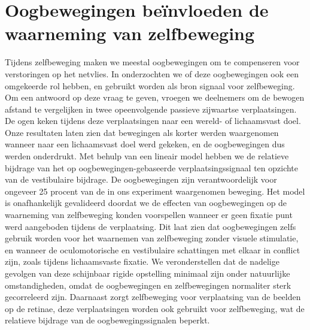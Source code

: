 \section{Oogbewegingen be\"invloeden de waarneming van zelfbeweging}
Tijdens zelfbeweging maken we meestal oogbewegingen om te compenseren voor verstoringen op het netvlies. In  onderzochten we of deze oogbewegingen ook een omgekeerde rol hebben, en gebruikt worden als bron signaal voor zelfbeweging. Om een antwoord op deze vraag te geven, vroegen we deelnemers om de bewogen afstand te vergelijken in twee opeenvolgende passieve zijwaartse verplaatsingen. De ogen keken tijdens deze verplaatsingen naar een wereld- of lichaamsvast doel. Onze resultaten laten zien dat bewegingen als korter werden waargenomen wanneer naar een lichaamsvast doel werd gekeken, en de oogbewegingen dus werden onderdrukt. Met behulp van een lineair model hebben we de relatieve bijdrage van het op oogbewegingen-gebaseerde  verplaatsingssignaal ten opzichte van de vestibulaire bijdrage. De oogbewegingen zijn verantwoordelijk voor ongeveer 25 procent van de in ons experiment waargenomen beweging. Het model is onafhankelijk gevalideerd doordat we de effecten van oogbewegingen op de waarneming van zelfbeweging konden voorspellen wanneer er geen fixatie punt werd aangeboden tijdens de verplaatsing. Dit laat zien dat oogbewegingen zelfs gebruik worden voor het waarnemen van zelfbeweging zonder visuele stimulatie, en wanneer de oculomotorische en vestibulaire schattingen met elkaar in conflict zijn, zoals tijdens lichaamsvaste fixatie. We veronderstellen dat de nadelige gevolgen van deze schijnbaar rigide opstelling minimaal zijn onder natuurlijke omstandigheden, omdat de oogbewegingen en zelfbewegingen normaliter sterk gecorreleerd zijn. Daarnaast zorgt zelfbeweging voor verplaatsing van de beelden op de retinae, deze verplaatsingen worden ook gebruikt voor zelfbeweging, wat de relatieve bijdrage van de oogbewegingssignalen beperkt.

